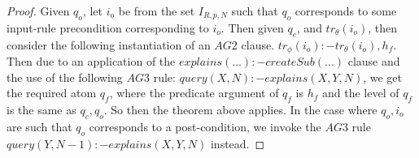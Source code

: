 \begin{proof} Given $q_{o}$, let $i_{o}$ be from the set $I_{R,p,N}$ such that $q_{o}$ corresponds to some input-rule precondition corresponding to $i_{o}$. Then given $q_{c}$, and $tr_{\theta}(i_{o})$, then consider the following instantiation of an $AG2$ clause. $tr_{\phi}(i_{o}):-tr_{\theta}(i_{o}),h_{f}$. Then due to an application of the $explains(...):-createSub(...)$ clause and the use of the following $AG3$ rule:
$query(X,N):-explains(X,Y,N)$, we get the required atom $q_{f}$, where the
predicate argument of $q_{f}$ is $h_{f}$ and the level of $q_{f}$ is the same as
$q_{c},q_{o}$. So then the theorem above applies. In the case where $q_{o},
i_{o}$ are such that $q_{o}$ corresponds to a post-condition, we invoke the
$AG3$ rule $query(Y,N-1):-explains(X,Y,N)$ instead.
\end{proof}


